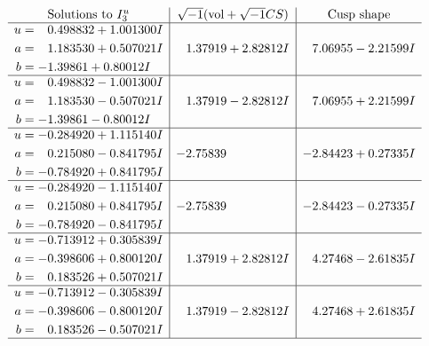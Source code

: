\documentclass[1p]{elsarticle_modified}
\theoremstyle{definition}
\newcommand{\I}{\sqrt{-1}}
\begin{document}
$$\begin{array}{c|c|c}  
\text{Solutions to }I^u_{3}& \I (\text{vol} + \sqrt{-1}CS) & \text{Cusp shape}\\
 \hline 
\begin{aligned}
u &= \phantom{-}0.498832 + 1.001300 I \\
a &= \phantom{-}1.183530 + 0.507021 I \\
b &= -1.39861 + 0.80012 I\end{aligned}
 & \phantom{-}1.37919 + 2.82812 I & \phantom{-}7.06955 - 2.21599 I \\ \hline\begin{aligned}
u &= \phantom{-}0.498832 - 1.001300 I \\
a &= \phantom{-}1.183530 - 0.507021 I \\
b &= -1.39861 - 0.80012 I\end{aligned}
 & \phantom{-}1.37919 - 2.82812 I & \phantom{-}7.06955 + 2.21599 I \\ \hline\begin{aligned}
u &= -0.284920 + 1.115140 I \\
a &= \phantom{-}0.215080 - 0.841795 I \\
b &= -0.784920 + 0.841795 I\end{aligned}
 & -2.75839\phantom{ +0.000000I} & -2.84423 + 0.27335 I \\ \hline\begin{aligned}
u &= -0.284920 - 1.115140 I \\
a &= \phantom{-}0.215080 + 0.841795 I \\
b &= -0.784920 - 0.841795 I\end{aligned}
 & -2.75839\phantom{ +0.000000I} & -2.84423 - 0.27335 I \\ \hline\begin{aligned}
u &= -0.713912 + 0.305839 I \\
a &= -0.398606 + 0.800120 I \\
b &= \phantom{-}0.183526 + 0.507021 I\end{aligned}
 & \phantom{-}1.37919 + 2.82812 I & \phantom{-}4.27468 - 2.61835 I \\ \hline\begin{aligned}
u &= -0.713912 - 0.305839 I \\
a &= -0.398606 - 0.800120 I \\
b &= \phantom{-}0.183526 - 0.507021 I\end{aligned}
 & \phantom{-}1.37919 - 2.82812 I & \phantom{-}4.27468 + 2.61835 I\\
 \hline 
 \end{array}$$\newpage
\end{document}

